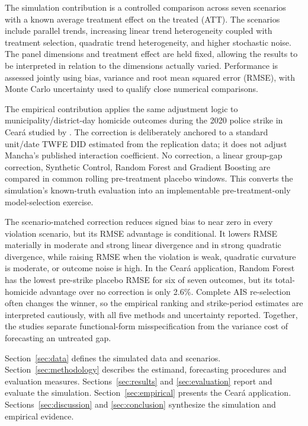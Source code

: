 \documentclass[11pt,a4paper]{article}
\begin{document}
The simulation contribution is a controlled comparison across seven scenarios with a known average treatment effect on the treated (ATT). The scenarios include parallel trends, increasing linear trend heterogeneity coupled with treatment selection, quadratic trend heterogeneity, and higher stochastic noise. The panel dimensions and treatment effect are held fixed, allowing the results to be interpreted in relation to the dimensions actually varied. Performance is assessed jointly using bias, variance and root mean squared error (RMSE), with Monte Carlo uncertainty used to qualify close numerical comparisons.

The empirical contribution applies the same adjustment logic to municipality/district-day homicide outcomes during the 2020 police strike in Cear\'a studied by \cite{mancha2025}. The correction is deliberately anchored to a standard unit/date TWFE DID estimated from the replication data; it does not adjust Mancha's published interaction coefficient. No correction, a linear group-gap correction, Synthetic Control, Random Forest and Gradient Boosting are compared in common rolling pre-treatment placebo windows. This converts the simulation's known-truth evaluation into an implementable pre-treatment-only model-selection exercise.

The scenario-matched correction reduces signed bias to near zero in every violation scenario, but its RMSE advantage is conditional. It lowers RMSE materially in moderate and strong linear divergence and in strong quadratic divergence, while raising RMSE when the violation is weak, quadratic curvature is moderate, or outcome noise is high. In the Cear\'a application, Random Forest has the lowest pre-strike placebo RMSE for six of seven outcomes, but its total-homicide advantage over no correction is only 2.6\%. Complete AIS re-selection often changes the winner, so the empirical ranking and strike-period estimates are interpreted cautiously, with all five methods and uncertainty reported. Together, the studies separate functional-form misspecification from the variance cost of forecasting an untreated gap.

Section~\ref{sec:data} defines the simulated data and scenarios. Section~\ref{sec:methodology} describes the estimand, forecasting procedures and evaluation measures. Sections~\ref{sec:results} and \ref{sec:evaluation} report and evaluate the simulation. Section~\ref{sec:empirical} presents the Cear\'a application. Sections~\ref{sec:discussion} and \ref{sec:conclusion} synthesize the simulation and empirical evidence.
\end{document}
